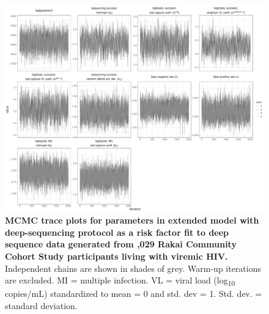 \documentclass[10pt,letterpaper]{article}
\begin{document}
\begin{figure}[!ht]
 \includegraphics[width=1\textwidth]{../../figures/empirical_seqtech_trace.pdf}
\caption{{\bf MCMC trace plots for parameters in extended model with deep-sequencing protocol as a risk factor fit to deep sequence data generated from ,029 Rakai Community Cohort Study participants living with viremic HIV.} Independent chains are shown in shades of grey. Warm-up iterations are excluded. MI = multiple infection. VL = viral load (log\textsubscript{10} copies/mL) standardized to mean = 0 and std. dev = 1. Std. dev. = standard deviation. }
\end{figure}
\end{document}
